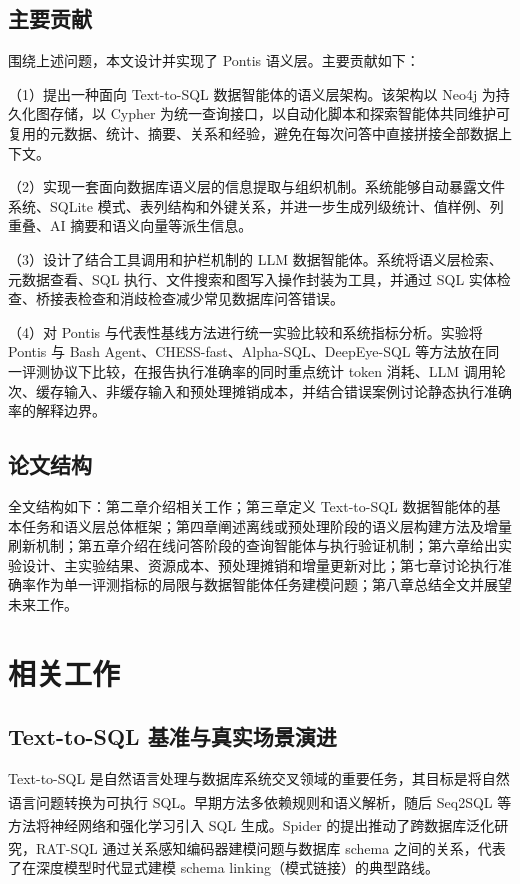 \documentclass[
    bachelor,
    pdflinks,
]{xjtuthesis}
\newcommand{\upcite}[1]{\textsuperscript{\cite{#1}}}
\begin{document}
\section{主要贡献}

围绕上述问题，本文设计并实现了 Pontis 语义层。主要贡献如下：

（1）提出一种面向 Text-to-SQL 数据智能体的语义层架构。该架构以 Neo4j 为持久化图存储，以 Cypher 为统一查询接口，以自动化脚本和探索智能体共同维护可复用的元数据、统计、摘要、关系和经验，避免在每次问答中直接拼接全部数据上下文。

（2）实现一套面向数据库语义层的信息提取与组织机制。系统能够自动暴露文件系统、SQLite 模式、表列结构和外键关系，并进一步生成列级统计、值样例、列重叠、AI 摘要和语义向量等派生信息。

（3）设计了结合工具调用和护栏机制的 LLM 数据智能体。系统将语义层检索、元数据查看、SQL 执行、文件搜索和图写入操作封装为工具，并通过 SQL 实体检查、桥接表检查和消歧检查减少常见数据库问答错误。

（4）对 Pontis 与代表性基线方法进行统一实验比较和系统指标分析。实验将 Pontis 与 Bash Agent、CHESS-fast、Alpha-SQL、DeepEye-SQL 等方法放在同一评测协议下比较，在报告执行准确率的同时重点统计 token 消耗、LLM 调用轮次、缓存输入、非缓存输入和预处理摊销成本，并结合错误案例讨论静态执行准确率的解释边界。

\section{论文结构}

全文结构如下：第二章介绍相关工作；第三章定义 Text-to-SQL 数据智能体的基本任务和语义层总体框架；第四章阐述离线或预处理阶段的语义层构建方法及增量刷新机制；第五章介绍在线问答阶段的查询智能体与执行验证机制；第六章给出实验设计、主实验结果、资源成本、预处理摊销和增量更新对比；第七章讨论执行准确率作为单一评测指标的局限与数据智能体任务建模问题；第八章总结全文并展望未来工作。

\chapter{相关工作}

\section{Text-to-SQL 基准与真实场景演进}

Text-to-SQL 是自然语言处理与数据库系统交叉领域的重要任务，其目标是将自然语言问题转换为可执行 SQL。早期方法多依赖规则和语义解析，随后 Seq2SQL\upcite{zhong2017seq2sql} 等方法将神经网络和强化学习引入 SQL 生成。Spider\upcite{yu2018spider} 的提出推动了跨数据库泛化研究，RAT-SQL\upcite{wang2020rat} 通过关系感知编码器建模问题与数据库 schema 之间的关系，代表了在深度模型时代显式建模 schema linking（模式链接）的典型路线。
\end{document}
